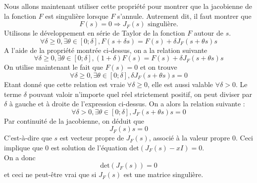 Nous allons maintenant utiliser cette propriété pour montrer que la jacobienne de la fonction $F$ est singulière lorsque $F$ s'annule. Autrement dit, il faut montrer que $$F(s) = 0 \Rightarrow J_{F}(s) \text{ singulière}.$$
Utilisons le développement en série de Taylor de la fonction $F$ autour de $s$.\\
$$\forall \delta \geq 0, \exists \theta \in [0;\delta], F(s+\delta s) = F(s) + \delta J_F(s+\theta s)s$$
A l'aide de la propriété montrée ci-dessus, on a la relation suivante  $$\forall \delta \geq 0, \exists \theta \in [0;\delta], (1+\delta)F(s) = F(s) + \delta J_F(s+\theta s)s$$
On utilise maintenant le fait que $F(s) = 0$ et on trouve $$\forall \delta \geq 0, \exists \theta \in [0;\delta], \delta J_F(s+\theta s)s = 0$$
Etant donné que cette relation est vraie $\forall \delta \geq 0$, elle est aussi valable $\forall \delta > 0$. Le terme $\delta$ pouvant valoir n'importe quel réel strictement positif, on peut diviser par $\delta$ à gauche et à droite de l'expression ci-dessus. On a alors la relation suivante : $$\forall \delta > 0, \exists \theta \in [0;\delta], J_F(s+\theta s)s = 0$$
Par continuité de la jacobienne, on déduit que $$J_F(s)s = 0$$
C'est-à-dire que $s$ est vecteur propre de $J_F(s)$, associé à la valeur propre $0$. Ceci implique que $0$ est solution de l'équation $\text{det}(J_F(s)-xI)=0$.\\
On a donc $$\text{det}(J_F(s))=0$$ et ceci ne peut-être vrai que si $J_F(s)$ est une matrice singulière.


